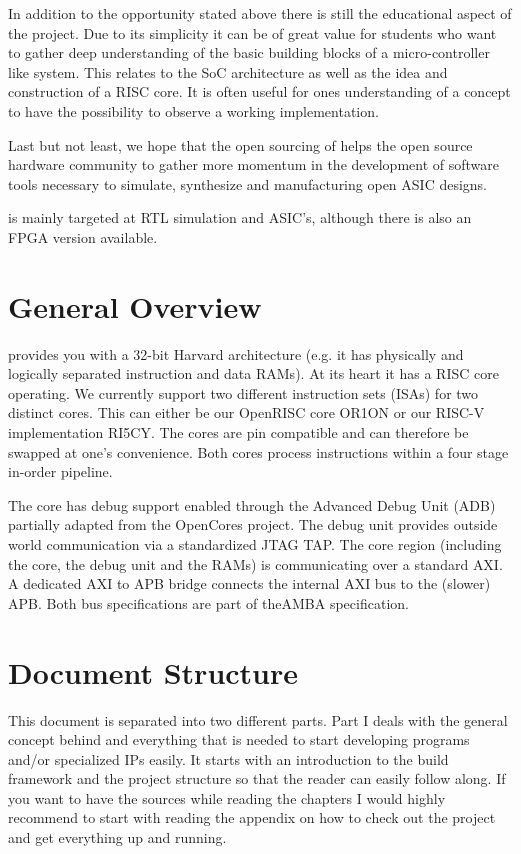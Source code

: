 In addition to the opportunity stated above there is still the educational aspect of the project. Due to its simplicity it can be of great value for students who want to gather deep understanding of the basic building blocks of a micro-controller like system. This relates to the SoC architecture as well as the idea and construction of a RISC core. It is often useful for ones understanding of a concept to have the possibility to observe a working implementation.

Last but not least, we hope that the open sourcing of \pulpino helps the open source hardware community to gather more momentum in the development of software tools necessary to simulate, synthesize and manufacturing open ASIC designs.

\pulpino is mainly targeted at RTL simulation and ASIC's, although there is also an FPGA version available.
\section{General Overview}

\pulpino provides you with a 32-bit Harvard architecture (e.g. it has physically and logically separated instruction and data RAMs). At its heart it has a \gls{RISC} core operating. We currently support two different instruction sets (ISAs) for two distinct cores. This can either be our OpenRISC core OR1ON or our RISC-V implementation RI5CY. The cores are pin compatible and can therefore be swapped at one's convenience. Both cores process instructions within a four stage in-order pipeline.

The core has debug support enabled through the Advanced Debug Unit (ADB) partially adapted from the OpenCores project. The debug unit provides outside world communication via a standardized JTAG TAP. The core region (including the core, the debug unit and the RAMs) is communicating over a standard \gls{AXI}. A dedicated AXI to APB bridge connects the internal AXI bus to the (slower) \gls{APB}. Both bus specifications are part of the\gls{AMBA} specification.

\section{Document Structure}

This document is separated into two different parts. Part I deals with the general concept behind \pulpino and everything that is needed to start developing programs and/or specialized IPs easily. It starts with an introduction to the build framework and the project structure so that the reader can easily follow along. If you want to have the sources while reading the chapters I would highly recommend to start with reading the appendix on how to check out the project and get everything up and running.

